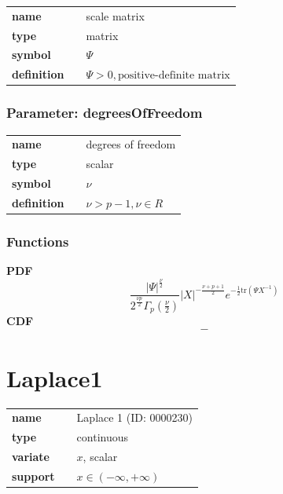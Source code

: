 \documentclass{article}
\begin{document}
\noindent\begin{tabular}{p{2cm}cl}
\textbf{name} & & scale matrix \\
\textbf{type} & & matrix \\
\textbf{symbol} & & $\Psi$  \\
\textbf{definition} & & $\Psi > 0, \text{positive-definite matrix}$
\end{tabular}
\subsubsection*{Parameter: degreesOfFreedom}

\noindent\begin{tabular}{p{2cm}cl}
\textbf{name} & & degrees of freedom \\
\textbf{type} & & scalar \\
\textbf{symbol} & & $\nu$  \\
\textbf{definition} & & $\nu > p-1, \nu \in  R$
\end{tabular}
\subsubsection*{Functions}

\smallskip \noindent \hspace{.2cm} \textbf{PDF} 
\begin{equation*}\frac{\left|\Psi\right|^{\frac{\nu}{2}}}{2^{\frac{\nu p}{2}}\Gamma_p(\frac{\nu}{2})} \left|X\right|^{-\frac{\nu+p+1}{2}}e^{-\frac{1}{2}\text{tr}(\Psi X^{-1})}\end{equation*}
\smallskip \noindent \hspace{.2cm} \textbf{CDF} 
\begin{equation*}-\end{equation*}
\smallskip\section*{Laplace1} 

  \bigskip 

\begin{tabular}{p{2cm}cl}
\textbf{name} & & Laplace 1 (ID: 0000230)\\ 
 
\textbf{type} & & continuous \\ 

\textbf{variate} & & $x$, scalar \\ 

\textbf{support} & & $x \in (-\infty,+\infty)$
\end{tabular}
\end{document}
